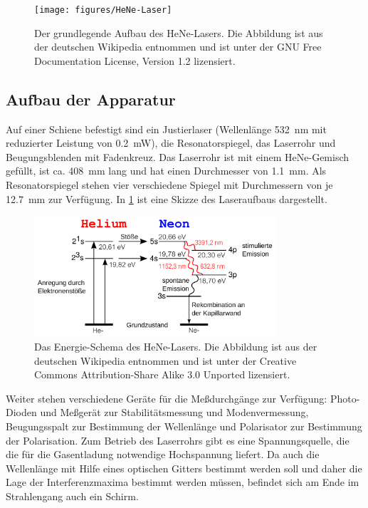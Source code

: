 \begin{figure}
  \centering
  \texttt{[image: figures/HeNe-Laser]}
  \caption{Der grundlegende Aufbau des HeNe-Lasers.  Die Abbildung ist
    aus der deutschen Wikipedia entnommen \cite{wikipedia:laser} und ist
    unter der GNU Free Documentation License, Version 1.2 lizensiert.}
  \label{fig:laser}
\end{figure}

\subsection{Aufbau der Apparatur}
Auf einer Schiene befestigt sind ein Justierlaser (Wellenlänge
\SI{532}{nm} mit reduzierter Leistung von \SI{0.2}{mW}), die
Resonatorspiegel, das Laserrohr und Beugungsblenden mit Fadenkreuz.  Das
Laserrohr ist mit einem HeNe-Gemisch gefüllt, ist ca. \SI{408}{mm} lang und 
hat einen Durchmesser von \SI{1.1}{mm}.  Als Resonatorspiegel stehen
vier verschiedene Spiegel mit Durchmessern von je \SI{12.7}{mm} zur 
Verfügung.
In \cref{fig:laser} ist eine Skizze des Laseraufbaus dargestellt.

\begin{figure}
  \centering
  \includegraphics[width=0.8\textwidth]{figures/HeNe-Laser-Energieschema}
  \caption{Das Energie-Schema des HeNe-Lasers.  Die Abbildung ist aus
    der deutschen Wikipedia entnommen \cite{wikipedia:laser} und ist
    unter der Creative Commons Attribution-Share Alike 3.0 Unported
    lizensiert.}
  \label{fig:laser-schema}
\end{figure}

Weiter stehen verschiedene Geräte für die Meßdurchgänge zur Verfügung:
Photo-Dioden und Meßgerät zur Stabilitätsmessung und Modenvermessung,
Beugungsspalt zur Bestimmung der Wellenlänge und Polarisator zur
Bestimmung der Polarisation.  Zum Betrieb des Laserrohrs gibt es eine
Spannungsquelle, die die für die Gasentladung notwendige Hochspannung
liefert.  Da auch die Wellenlänge mit Hilfe eines optischen Gitters
bestimmt werden soll und daher die Lage der Interferenzmaxima bestimmt
werden müssen, befindet sich am Ende im Strahlengang auch ein Schirm.

